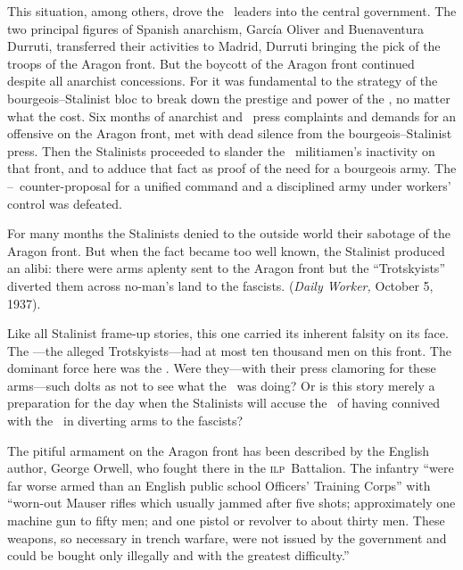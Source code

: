 \indexCNT
This situation, among others, drove the \CNT\ leaders into the central government. The two principal figures of Spanish anarchism, Garc\'ia Oliver and Buenaventura Durruti, transferred their activities to Madrid, Durruti bringing the pick of the troops of the Aragon front. But the boycott of the Aragon front continued despite all anarchist concessions. For it was fundamental to the strategy of the bourgeois--Stalinist bloc to break down the prestige and power of the \CNT, no matter what the cost. Six months of anarchist and \POUM\ press complaints and demands for an offensive on the Aragon front, met with dead silence from the bourgeois--Stalinist press. Then the Stalinists proceeded to slander the \CNT\ militiamen’s inactivity on that front, and to adduce that fact as proof of the need for a bourgeois army. The \CNT--\POUM\ counter-proposal for a unified command and a disciplined army under workers’ control was defeated.

\indexPOUM{}
For many months the Stalinists denied to the outside world their sabotage of the Aragon front. But when the fact became too well known, the Stalinist produced an alibi: there were arms aplenty sent to the Aragon front but the ``Trotskyists'' diverted them across no-man’s land to the fascists. (\emph{Daily Worker,} October 5, 1937).

Like all Stalinist frame-up stories, this one carried its inherent falsity on its face. The \POUM---the alleged Trotskyists---had at most ten thousand men on this front. The dominant force here was the \CNT. Were they---with their press clamoring for these arms---such dolts as not to see what the \POUM\ was doing? Or is this story merely a preparation for the day when the Stalinists will accuse the \CNT\ of having connived with the \POUM\ in diverting arms to the fascists?

The pitiful armament on the Aragon front has been described by the English author, George Orwell, who fought there in the \textsc{ilp}~Battalion. The infantry ``were far worse armed than an English public school Officers’ Training Corps'' with ``worn-out Mauser rifles which usually jammed after five shots; approximately one machine gun to fifty men; and one pistol or revolver to about thirty men. These weapons, so necessary in trench warfare, were not issued by the government and could be bought only illegally and with the greatest difficulty.''

